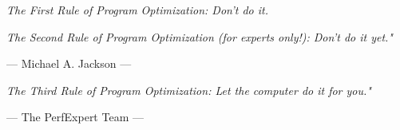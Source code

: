 \documentclass[11pt,a4paper,oneside]{book}
\begin{document}
\pagestyle{empty}



\glsaddall
\printglossaries

\cleardoublepage
{}
\printindex

\tableofcontents



\emph{The First Rule of Program Optimization: Don't do it.}

\emph{The Second Rule of Program Optimization (for experts only!): Don't do it yet."}

  ---  Michael A. Jackson ---

\emph{The Third Rule of Program Optimization: Let the computer do it for you."}

--- The PerfExpert Team ---






\appendix


\end{document}
